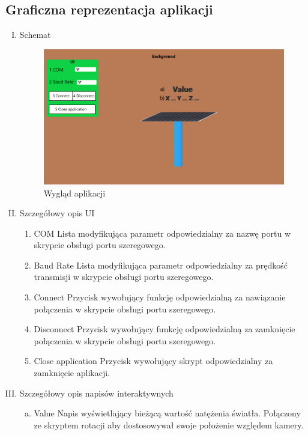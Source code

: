 \documentclass[10pt, a4paper]{article}
\begin{document}
	\subsection{Graficzna reprezentacja aplikacji}
		\begin{enumerate}[I.]
			\item Schemat
				\begin{figure}[H]
					\centering
					\includegraphics[width=1\textwidth]{figures/paint.png}
					\caption{Wygląd aplikacji}
					\label{fig:ArchitekturaBD1}
				\end{figure}
			\newpage
			\item Szczegółowy opis UI
				\begin{enumerate}[1]
					\item COM
						\newline	
						Lista modyfikująca parametr odpowiedzialny za nazwę portu w skrypcie obsługi portu szeregowego.
					
					\item Baud Rate
						\newline	
						Lista modyfikująca parametr odpowiedzialny za prędkość transmisji w skrypcie obsługi portu szeregowego.
					
					\item Connect
						\newline	
						Przycisk wywołujący funkcję odpowiedzialną za nawiązanie połączenia w skrypcie obsługi portu szeregowego.
						
					\item Disconnect
						\newline	
						Przycisk wywołujący funkcję odpowiedzialną za zamknięcie połączenia w skrypcie obsługi portu szeregowego.
						
					\item Close application
						\newline	
						Przycisk wywołujący skrypt odpowiedzialny za zamknięcie aplikacji.
				\end{enumerate}
			\item Szczegółowy opis napisów interaktywnych
			\begin{enumerate}[a)]
				\item Value
				\newline	
				Napis wyświetlający bieżącą wartość natężenia światła. Połączony ze skryptem rotacji aby dostosowywał swoje położenie względem kamery.
				

\end{enumerate}
\end{enumerate}
\end{document}

